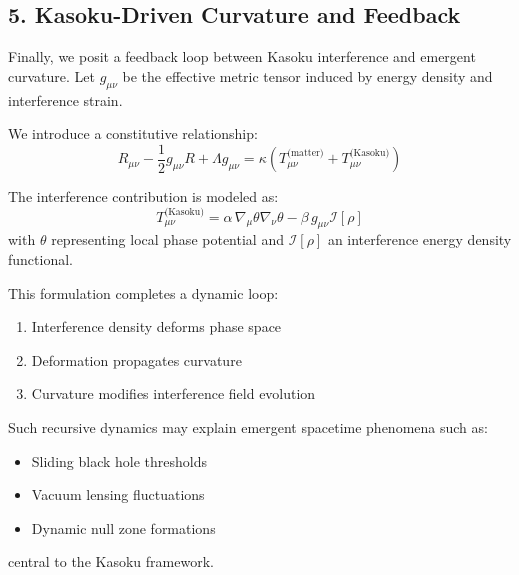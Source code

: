 \subsection*{5. Kasoku-Driven Curvature and Feedback}

Finally, we posit a feedback loop between Kasoku interference and emergent curvature. Let $g_{\mu\nu}$ be the effective metric tensor induced by energy density and interference strain.

We introduce a constitutive relationship:
\[
R_{\mu\nu} - \frac{1}{2}g_{\mu\nu} R + \Lambda g_{\mu\nu} = \kappa \left( T_{\mu\nu}^{\text{(matter)}} + T_{\mu\nu}^{\text{(Kasoku)}} \right)
\]

The interference contribution is modeled as:
\[
T_{\mu\nu}^{\text{(Kasoku)}} = \alpha\, \nabla_\mu \theta \nabla_\nu \theta - \beta\, g_{\mu\nu} \mathcal{I}[\rho]
\]
with $\theta$ representing local phase potential and $\mathcal{I}[\rho]$ an interference energy density functional.

This formulation completes a dynamic loop:
\begin{enumerate}
  \item Interference density deforms phase space
  \item Deformation propagates curvature
  \item Curvature modifies interference field evolution
\end{enumerate}

Such recursive dynamics may explain emergent spacetime phenomena such as:
\begin{itemize}
  \item Sliding black hole thresholds
  \item Vacuum lensing fluctuations
  \item Dynamic null zone formations
\end{itemize}
central to the Kasoku framework.

%
%
\newpage
